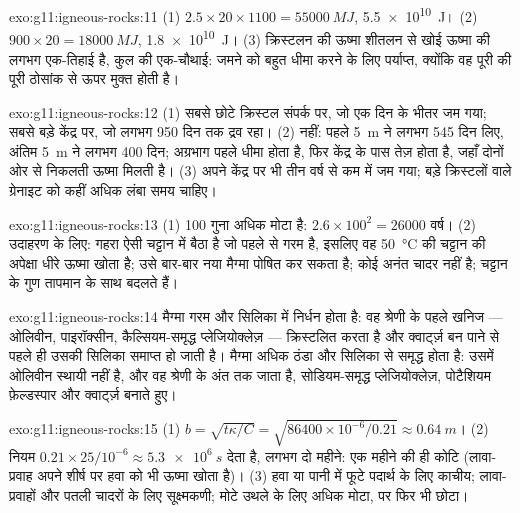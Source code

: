 \begin{solution}{exo:g11:igneous-rocks:11}
(1) $2.5 \times 20 \times 1100 = \qty{55000}{MJ}$, \qty{5.5e10}{J}।
(2) $900 \times 20 = \qty{18000}{MJ}$, \qty{1.8e10}{J}। (3) क्रिस्टलन की
ऊष्मा शीतलन से खोई ऊष्मा की लगभग एक-तिहाई है, कुल की
एक-चौथाई: जमने को बहुत धीमा करने के लिए पर्याप्त, क्योंकि वह पूरी की पूरी
ठोसांक से ऊपर मुक्त होती है।
\end{solution}

\begin{solution}{exo:g11:igneous-rocks:12}
(1) सबसे छोटे क्रिस्टल संपर्क पर, जो एक दिन के भीतर जम गया; सबसे
बड़े केंद्र पर, जो लगभग 950 दिन तक द्रव रहा। (2) नहीं: पहले
\qty{5}{m} ने लगभग 545 दिन लिए, अंतिम \qty{5}{m} ने लगभग 400 दिन;
अग्रभाग पहले धीमा होता है, फिर केंद्र के पास तेज़ होता है, जहाँ दोनों ओर से
निकलती ऊष्मा मिलती है। (3) अपने केंद्र पर भी  तीन वर्ष से कम में
जम गया; बड़े क्रिस्टलों वाले ग्रेनाइट को कहीं अधिक लंबा समय चाहिए।
\end{solution}

\begin{solution}{exo:g11:igneous-rocks:13}
(1)  100 गुना अधिक मोटा है: $2.6 \times 100^2 = \num{26000}$
वर्ष। (2) उदाहरण के लिए: गहरा  ऐसी चट्टान में बैठा है जो पहले से गरम है, इसलिए
वह \qty{50}{\degreeCelsius} की चट्टान की अपेक्षा धीरे ऊष्मा खोता है; उसे
बार-बार नया मैग्मा पोषित कर सकता है;  कोई अनंत चादर नहीं है;
चट्टान के गुण तापमान के साथ बदलते हैं।
\end{solution}

\begin{solution}{exo:g11:igneous-rocks:14}
 मैग्मा गरम और सिलिका में निर्धन होता है: वह श्रेणी के पहले खनिज
--- ओलिवीन, पाइरॉक्सीन, कैल्सियम-समृद्ध प्लेजियोक्लेज़ --- क्रिस्टलित करता है और क्वार्ट्ज़
बन पाने से पहले ही उसकी सिलिका समाप्त हो जाती है।  मैग्मा अधिक ठंडा और सिलिका
से समृद्ध होता है: उसमें ओलिवीन स्थायी नहीं है, और वह श्रेणी के अंत तक
जाता है, सोडियम-समृद्ध प्लेजियोक्लेज़, पोटैशियम फ़ेल्डस्पार और क्वार्ट्ज़ बनाते हुए।
\end{solution}

\begin{solution}{exo:g11:igneous-rocks:15}
(1) $b = \sqrt{t\kappa/C} = \sqrt{86400 \times 10^{-6}/0.21} \approx
\qty{0.64}{m}$। (2) नियम $0.21 \times 25/10^{-6} \approx
\qty{5.3e6}{s}$ देता है, लगभग दो महीने: एक महीने की ही कोटि (लावा-प्रवाह
अपने शीर्ष पर हवा को भी ऊष्मा खोता है)। (3) हवा या पानी में फूटे पदार्थ के लिए
काचीय; लावा-प्रवाहों और पतली चादरों के लिए सूक्ष्मकणी; मोटे उथले  के लिए
अधिक मोटा, पर फिर भी छोटा।
\end{solution}


